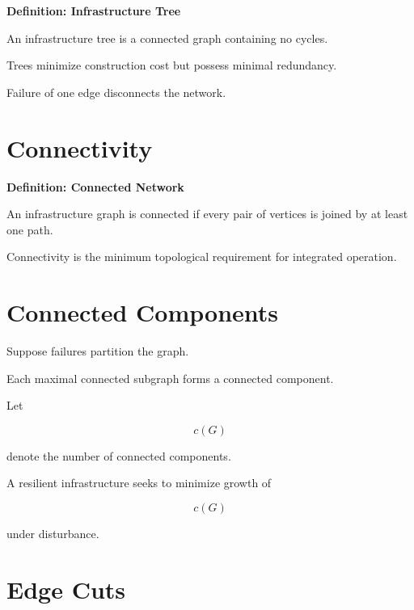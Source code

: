 \documentclass[11pt,fleqn]{book}
\numberwithin{equation}{chapter}
\newenvironment{definition}[1]
  {\begin{definitionEnv}
   \noindent\textbf{Definition: #1}\par\smallskip}
  {\end{definitionEnv}}
\theoremstyle{plain}
\theoremstyle{definition}
\theoremstyle{remark}
\begin{document}

\begin{definition}{Infrastructure Tree}

An infrastructure tree is a connected graph containing no cycles.

\end{definition}

Trees minimize construction cost but possess minimal redundancy.

Failure of one edge disconnects the network.


\section{Connectivity}


\begin{definition}{Connected Network}

An infrastructure graph is connected if every pair of vertices is joined
by at least one path.

\end{definition}

Connectivity is the minimum topological requirement for integrated
operation.


\section{Connected Components}

Suppose failures partition the graph.

Each maximal connected subgraph forms a connected component.

Let

\[
c(G)
\]

denote the number of connected components.

A resilient infrastructure seeks to minimize growth of

\[
c(G)
\]

under disturbance.


\section{Edge Cuts}
\end{document}
